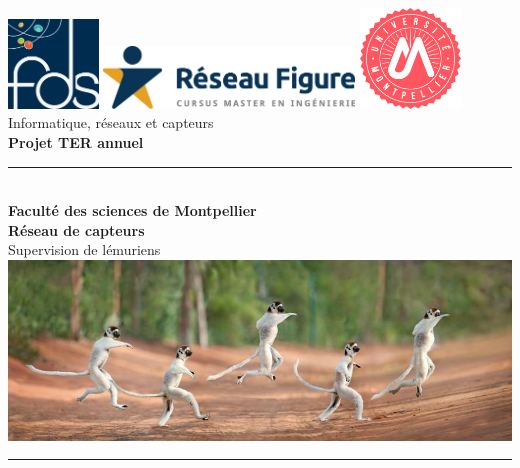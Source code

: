 \begin{titlepage}
\begin{center}

\includegraphics[width=0.18\textwidth]{images/logos/fds_logo.jpg}
\hspace{0.3cm}
\includegraphics[width=0.5\textwidth]{images/logos/figure_logo.jpg}
\hspace{0.3cm}
\includegraphics[width=0.2\textwidth]{images/logos/um_logo.png}\\[1.5cm]


{\large Informatique, réseaux et capteurs}\\[0.5cm]
{\Large \bfseries Projet TER annuel}\\[0.5cm]

\rule{\linewidth}{0.5mm} \\[0.4cm]
{ \Large \bfseries Faculté des sciences de Montpellier\\[0.4cm] }
{ \Huge \bfseries Réseau de capteurs\\[0.4cm] }
{ \Large Supervision de lémuriens\\[0.4cm] }
\includegraphics[trim={0cm 0cm 0cm 0cm},clip,scale=0.71]{images/photos/banniere.jpg}
\rule{\linewidth}{0.5mm} \\[1cm]



\end{center}
\end{titlepage}
